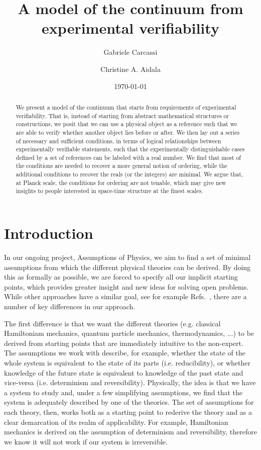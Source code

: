 \documentclass[submission,copyright,creativecommons]{eptcs}
\title{A model of the continuum from experimental verifiability}
\author{Gabriele Carcassi \institute{Physics Department\\ University of Michigan}
	\email{carcassi@umich.edu}
	\and Christine A. Aidala
	\institute{Physics Department\\ University of Michigan}
	\email{caidala@umich.edu}
}
\date{\today}
\begin{document}
\maketitle


\begin{abstract}
We present a model of the continuum that starts from requirements of experimental verifiability. That is, instead of starting from abstract mathematical structures or constructions, we posit that we can use a physical object as a reference such that we are able to verify whether another object lies before or after. We then lay out a series of necessary and sufficient conditions, in terms of logical relationships between experimentally verifiable statements, such that the experimentally distinguishable cases defined by a set of references can be labeled with a real number. We find that most of the conditions are needed to recover a more general notion of ordering, while the additional conditions to recover the reals (or the integers) are minimal. We argue that, at Planck scale, the conditions for ordering are not tenable, which may give new insights to people interested in space-time structure at the finest scales.
\end{abstract}

\section{Introduction}

In our ongoing project, Assumptions of Physics, we aim to find a set of minimal assumptions from which the different physical theories can be derived. By doing this as formally as possible, we are forced to specify all our implicit starting points, which provides greater insight and new ideas for solving open problems. While other approaches have a similar goal, see for example Refs.~\cite{PhysRevA.84.012311,QLogicReview,Hardy:2001jk,ludwig_hein_2013}, there are a number of key differences in our approach.

The first difference is that we want the different theories (e.g. classical Hamiltoniam mechanics, quantum particle mechanics, thermodynamics, ...) to be derived from starting points that are immediately intuitive to the non-expert. The assumptions we work with describe, for example, whether the state of the whole system is equivalent to the state of its parts (i.e. reducibility), or whether knowledge of the future state is equivalent to knowledge of the past state and vice-versa (i.e. determinism and reversibility). Physically, the idea is that we have a system to study and, under a few simplifying assumptions, we find that the system is adequately described by one of the theories. The set of assumptions for each theory, then, works both as a starting point to rederive the theory and as a clear demarcation of its realm of applicability. For example, Hamiltonian mechanics is derived on the assumption of determinism and reversibility, therefore we know it will not work if our system is irreversible.
\end{document}
